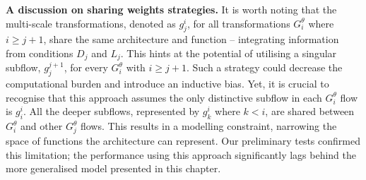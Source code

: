 \smallskip

\textbf{A discussion on sharing weights strategies.} It is worth noting that the multi-scale transformations, denoted as \(g_j^i\), for all transformations \(G_i^{\theta}\) where \(i \geq j+1\), share the same architecture and function – integrating information from conditions \(D_j\) and \(L_j\). This hints at the potential of utilising a singular subflow, \(g_j^{j+1}\), for every \(G_i^{\theta}\) with \(i \geq j+1\). Such a strategy could decrease the computational burden and introduce an inductive bias. Yet, it is crucial to recognise that this approach assumes the only distinctive subflow in each \(G_i^{\theta}\) flow is \(g_i^i\). All the deeper subflows, represented by \(g_k^i\) where \(k<i\), are shared between \(G_i^{\theta}\) and other \(G_j^{\theta}\) flows. This results in a modelling constraint, narrowing the space of functions the architecture can represent. Our preliminary tests confirmed this limitation; the performance using this approach significantly lags behind the more generalised model presented in this chapter.

